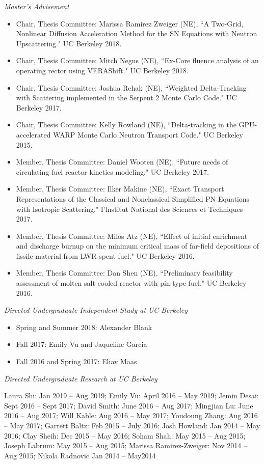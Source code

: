 \textit{Master's Advisement}
\begin{itemize}
\item Chair, Thesis Committee: Marissa Ramirez Zweiger (NE), ``A Two-Grid, Nonlinear Diffusion Acceleration Method for the SN Equations with Neutron Upscattering." UC Berkeley 2018.
%
\item Chair, Thesis Committee: Mitch Negus (NE), ``Ex-Core fluence analysis of an operating rector using VERAShift." UC Berkeley 2018.
%
\item Chair, Thesis Committee: Joshua Rehak (NE), ``Weighted Delta-Tracking with Scattering implemented in the Serpent 2 Monte Carlo Code." UC Berkeley 2017.
%
\item Chair, Thesis Committee: Kelly Rowland (NE), ``Delta-tracking in the GPU-accelerated WARP Monte Carlo Neutron Transport Code." UC Berkeley 2015.
%
\item Member, Thesis Committee: Daniel Wooten (NE), ``Future needs of circulating fuel reactor kinetics modeling." UC Berkeley 2017.
\item Member, Thesis Committee: Ilker Makine (NE), ``Exact Transport Representations of the Classical and Nonclassical Simplified PN Equations with Isotropic Scattering." I'lnstitut National des Sciences et Techniques 2017.
%
\item Member, Thesis Committee: Milos Atz (NE), ``Effect of initial enrichment and discharge burnup on the minimum critical mass of far-field depositions of fissile material from LWR spent fuel." UC Berkeley 2016.
%
\item Member, Thesis Committee: Dan Shen (NE), ``Preliminary feasibility assessment of molten salt cooled reactor with pin-type fuel." UC Berkeley 2016.
\end{itemize}

\textit{Directed Undergraduate Independent Study at UC Berkeley}
\begin{itemize}
\item Spring and Summer 2018: Alexander Blank
\item Fall 2017: Emily Vu and Jaqueline Garcia
\item Fall 2016 and Spring 2017: Eliav Maas
\end{itemize}
\textit{Directed Undergraduate Research at UC Berkeley}
\vspace*{-.6 em}
\begin{addmargin}[1em]{0 em}
Laura Shi: Jan 2019 -- Aug 2019;
Emily Vu: April 2016 -- May 2019; 
Jemin Desai: Sept 2016 -- Sept 2017; 
David Smith: June 2016 -- Aug 2017; 
Mingjian Lu: June 2016 -- Aug 2017; 
Will Kable: Aug 2016 -- May 2017; 
Youdoung Zhang: Aug 2016 -- May 2017; 
Garrett Baltz: Feb 2015 -- July 2016; 
Josh Howland: Jan 2014 -- May 2016; 
Clay Sheih: Dec 2015 -- May 2016;
Soham Shah: May 2015 -- Aug 2015; 
Joseph Labrum: May 2015 -- Aug 2015; 
Marissa Ramirez-Zweiger: Nov 2014 -- Aug 2015; 
Nikola Radnovic Jan 2014 -- May2014 

\end{addmargin}

